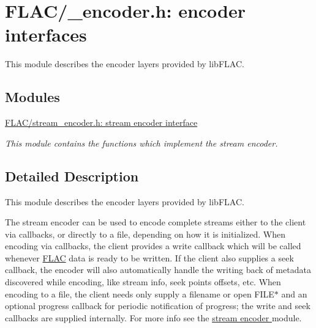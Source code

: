 \hypertarget{group__flac__encoder}{}\section{F\+L\+A\+C/\+\_\+encoder.h\+: encoder interfaces}
\label{group__flac__encoder}


This module describes the encoder layers provided by lib\+F\+L\+AC.  


\subsection*{Modules}
\begin{DoxyCompactItemize}
\item 
\hyperlink{group__flac__stream__encoder}{F\+L\+A\+C/stream\+\_\+encoder.\+h\+: stream encoder interface}
\begin{DoxyCompactList}\small\item\em This module contains the functions which implement the stream encoder. \end{DoxyCompactList}\end{DoxyCompactItemize}


\subsection{Detailed Description}
This module describes the encoder layers provided by lib\+F\+L\+AC. 

The stream encoder can be used to encode complete streams either to the client via callbacks, or directly to a file, depending on how it is initialized. When encoding via callbacks, the client provides a write callback which will be called whenever \hyperlink{namespace_f_l_a_c}{F\+L\+AC} data is ready to be written. If the client also supplies a seek callback, the encoder will also automatically handle the writing back of metadata discovered while encoding, like stream info, seek points offsets, etc. When encoding to a file, the client needs only supply a filename or open {\ttfamily F\+I\+L\+E$\ast$} and an optional progress callback for periodic notification of progress; the write and seek callbacks are supplied internally. For more info see the \hyperlink{group__flac__stream__encoder}{stream encoder } module. 